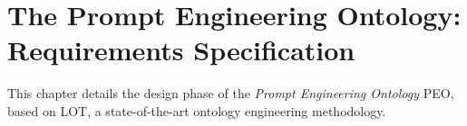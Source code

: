 \chapter{The Prompt Engineering Ontology: Requirements Specification}
This chapter details the design phase of the \textit{Prompt Engineering Ontology} PEO, based on LOT, a state-of-the-art ontology engineering methodology.

